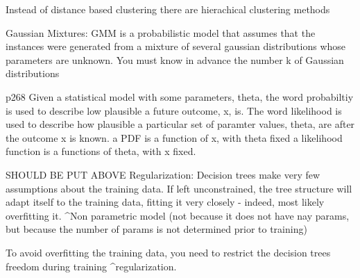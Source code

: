 Instead of distance based clustering
there are hierachical clustering methods


Gaussian Mixtures:
GMM is a probabilistic model that assumes that the instances were generated from a mixture of several gaussian distributions
whose parameters are unknown.
You must know in advance the number k of Gaussian distributions

p268
Given a statistical model with some parameters, theta, the word probabiltiy is used to describe low plausible a future outcome, x, is.
The word likelihood is used to describe how plausible a particular set of paramter values, theta, are after the outcome x is known.
a PDF is a function of x, with theta fixed
a likelihood function is a functions of theta, with x fixed.







SHOULD BE PUT ABOVE Regularization:
Decision trees make very few assumptions about the training data.
If left unconstrained,
the tree structure will adapt itself to the training data,
fitting it very closely - indeed, most likely overfitting it.
^Non parametric model
(not because it does not have nay params,
but because the number of params is not determined prior to training)

To avoid overfitting the training data,
you need to restrict the decision trees freedom during training
^regularization.









































































